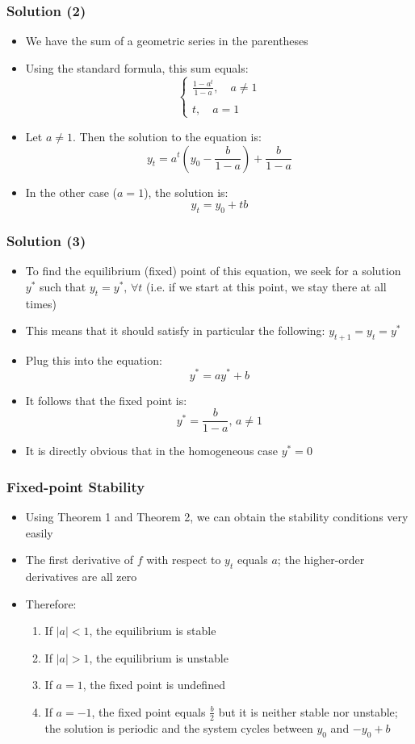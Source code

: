 \documentclass[10pt,usenames,dvipsnames]{beamer}
\theoremstyle{plain}
\theoremstyle{definition}
\begin{document}
\begin{frame}[fragile]
\frametitle{Solution (2)}
\begin{itemize}
	\item We have the sum of a geometric series in the parentheses
	\item Using the standard formula, this sum equals:
	\[
	\left\{
	\begin{array}{lcl}
			 \displaystyle \frac{1 - a^{t}}{1-a},\quad a\neq 1\\
			 \quad\\
			 t, \quad a = 1 
	\end{array}
	\right.
	\]
	\item Let $a\neq 1$. Then the solution to the equation is:
	\[
		y_{t} = a^{t}\left(y_{0} - \frac{b}{1-a}\right) + \frac{b}{1-a}
	\]
	\item In the other case ($a=1$), the solution is:
	\[
		y_{t} = y_{0} + tb
	\]
\end{itemize}
\end{frame}

\begin{frame}[fragile]
\frametitle{Solution (3)}
\begin{itemize}
	\item To find the equilibrium (fixed) point of this equation, we seek for a solution $y^{*}$ such that $y_{t} = y^{*},\,\forall t$ (i.e. if we start at this point, we stay there at all times)
	\item This means that it should satisfy in particular the following: $y_{t+1} = y_{t} = y^{*}$
	\item Plug this into the equation:
	\[
		y^{*} = ay^{*} + b
	\]
	\item It follows that the fixed point is:
	\[
		y^{*} = \frac{b}{1-a},\, a \neq 1
	\]
	\item It is directly obvious that in the homogeneous case $y^{*} = 0$
\end{itemize}
\end{frame}

\begin{frame}[fragile]
\frametitle{Fixed-point Stability}
\begin{itemize}
	\item Using Theorem 1 and Theorem 2, we can obtain the stability conditions very easily
	\item The first derivative of $f$ with respect to $y_{t}$ equals $a$; the higher-order derivatives are all zero
	\item Therefore:
	\begin{enumerate}
		\item If $|a| < 1$, the equilibrium is stable
		\item If $|a| > 1$, the equilibrium is unstable
		\item If $a = 1$, the fixed point is undefined
		\item If $a = -1$, the fixed point equals $\displaystyle \frac{b}{2}$ but it is neither stable nor unstable; the solution is periodic and the system cycles between $y_{0}$ and $-y_{0} + b$
	\end{enumerate}
\end{itemize}
\end{frame}
\end{document}
